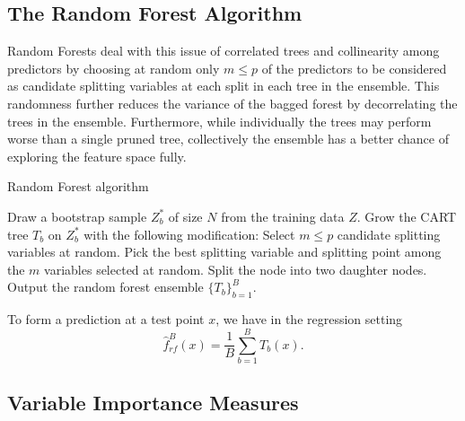 \documentclass[12pt,twoside]{reedthesis}
\theoremstyle{definition}
\theoremstyle{definition}
\theoremstyle{definition}
\theoremstyle{remark}
\begin{document}
\subsection{The Random Forest
Algorithm}\label{the-random-forest-algorithm}

Random Forests deal with this issue of correlated trees and collinearity
among predictors by choosing at random only \(m\leq p\) of the
predictors to be considered as candidate splitting variables at each
split in each tree in the ensemble. This randomness further reduces the
variance of the bagged forest by decorrelating the trees in the
ensemble. Furthermore, while individually the trees may perform worse
than a single pruned tree, collectively the ensemble has a better chance
of exploring the feature space fully. \par
\begin{algorithm}
        \caption{Random Forest algorithm}\label{random forest}
        \begin{algorithmic}[1]
            \State Draw a bootstrap sample $Z_b^*$ of size $N$ from the training data $Z$.
            \State Grow the CART tree $T_b$ on $Z_b^*$ with the following modification:
            \State Select $m\leq p$ candidate splitting variables at random.
            \State Pick the best splitting variable and splitting point among the $m$ variables selected at random.
            \State Split the node into two daughter nodes.
            \EndWhile
            \EndFor
            \State Output the random forest ensemble $\{T_b\}_{b=1}^B$.
        \end{algorithmic}
    \end{algorithm}
To form a prediction at a test point \(x\), we have in the regression
setting \[\hat{f}_{rf}^B(x)=\frac{1}{B}\sum_{b=1}^B T_b(x).\] \par

\subsection{Variable Importance
Measures}\label{variable-importance-measures}
\end{document}
